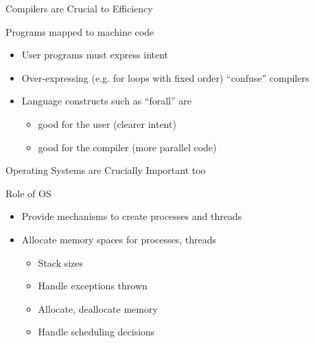 \documentclass{beamer}
\begin{document}
\begin{frame}{Compilers are Crucial to Efficiency}

\noindent Programs mapped to machine code
\begin{itemize}
\item User programs must express intent
\item Over-expressing (e.g. for loops with fixed order)
  ``confuse'' compilers
\item Language constructs such as ``forall'' are
  \begin{itemize}
  \item good for the user (clearer intent)
  \item good for the compiler (more parallel code)
  \end{itemize}
\end{itemize}
 
\end{frame}



\begin{frame}{Operating Systems are Crucially Important too}

\noindent Role of OS
\begin{itemize}
\item Provide mechanisms to create processes and threads
\item Allocate memory spaces for processes, threads
  \begin{itemize}
  \item Stack sizes
  \item Handle exceptions thrown
  \item Allocate, deallocate memory
  \item Handle scheduling decisions
  \end{itemize}
\end{itemize}
 
\end{frame}


\end{document}
